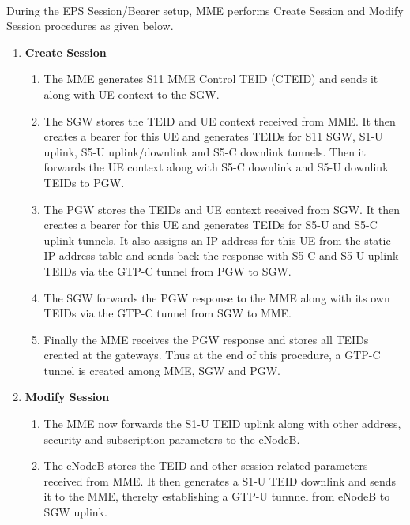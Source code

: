 \documentclass[hidelinks]{report}
\begin{document}
~\\ During the EPS Session/Bearer setup, MME performs Create Session and Modify Session procedures as given below.

\begin{enumerate}

\item \textbf{Create Session}

\begin{enumerate}

\item The MME generates S11 MME Control TEID (CTEID) and sends it along with UE context to the SGW. 

\item The SGW stores the TEID and UE context received from MME. It then creates a bearer for this UE and generates TEIDs for S11 SGW, S1-U uplink, S5-U uplink/downlink and S5-C downlink tunnels. Then it forwards the UE context along with S5-C downlink and S5-U downlink TEIDs to PGW.

\item The PGW stores the TEIDs and UE context received from SGW. It then creates a bearer for this UE and generates TEIDs for S5-U and S5-C uplink tunnels. It also assigns an IP address for this UE from the static IP address table and sends back the response with S5-C and S5-U uplink TEIDs via the GTP-C tunnel from PGW to SGW.

\item The SGW forwards the PGW response to the MME along with its own TEIDs via the GTP-C tunnel from SGW to MME.

\item Finally the MME receives the PGW response and stores all TEIDs created at the gateways. Thus at the end of this procedure, a GTP-C tunnel is created among MME, SGW and PGW. 

\end{enumerate}

\item \textbf{Modify Session}

\begin{enumerate}

\item The MME now forwards the S1-U TEID uplink along with other address, security and subscription parameters to the eNodeB.

\item The eNodeB stores the TEID and other session related parameters received from MME. It then generates a S1-U TEID downlink and sends it to the MME, thereby establishing a GTP-U tunnnel from eNodeB to SGW uplink.


\end{enumerate}
\end{enumerate}
\end{document}
